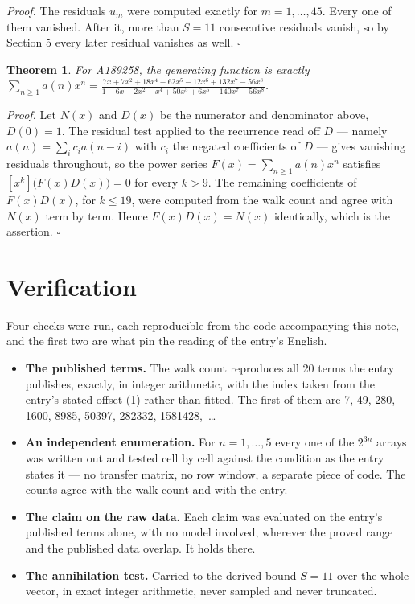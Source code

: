 \documentclass[11pt]{article}
\newtheorem{theorem}{Theorem}
\theoremstyle{definition}
\begin{document}
{\itshape Proof.} The residuals $u_m$ were computed exactly for $m = 1,\dots,45$. Every one of them vanished. After it, more than $S = 11$ consecutive residuals vanish, so by Section 5 every later residual vanishes as well. $\square$

\begin{theorem} For A189258, the generating function is exactly $\sum_{n\ge 1} a(n)x^n = \frac{7x + 7x^{2} + 18x^{4} - 62x^{5} - 12x^{6} + 132x^{7} - 56x^{8}}{1 - 6x + 2x^{2} - x^{4} + 50x^{5} + 6x^{6} - 140x^{7} + 56x^{8}}$.\end{theorem}

{\itshape Proof.} Let $N(x)$ and $D(x)$ be the numerator and denominator above, $D(0)=1$. The residual test applied to the recurrence read off $D$ --- namely $a(n) = \sum_i c_i a(n-i)$ with $c_i$ the negated coefficients of $D$ --- gives vanishing residuals throughout, so the power series $F(x)=\sum_{n\ge 1}a(n)x^n$ satisfies $[x^k]\bigl(F(x)D(x)\bigr) = 0$ for every $k > 9$. The remaining coefficients of $F(x)D(x)$, for $k \le 19$, were computed from the walk count and agree with $N(x)$ term by term. Hence $F(x)D(x) = N(x)$ identically, which is the assertion. $\square$

\section{Verification}

Four checks were run, each reproducible from the code accompanying this note, and the first two are what pin the reading of the entry's English.

\begin{itemize}

\item {\bfseries The published terms.} The walk count reproduces all 20 terms the entry publishes, exactly, in integer arithmetic, with the index taken from the entry's stated offset (1) rather than fitted. The first of them are 7, 49, 280, 1600, 8985, 50397, 282332, 1581428,~\dots

\item {\bfseries An independent enumeration.} For $n = 1,\dots,5$ every one of the $2^{3n}$ arrays was written out and tested cell by cell against the condition as the entry states it --- no transfer matrix, no row window, a separate piece of code. The counts agree with the walk count and with the entry.

\item {\bfseries The claim on the raw data.} Each claim was evaluated on the entry's published terms alone, with no model involved, wherever the proved range and the published data overlap. It holds there.

\item {\bfseries The annihilation test.} Carried to the derived bound $S = 11$ over the whole vector, in exact integer arithmetic, never sampled and never truncated.

\end{itemize}
\end{document}
